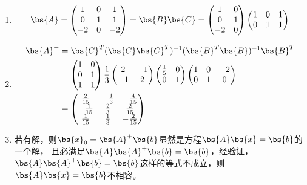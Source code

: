 \documentclass[12pt, a4paper, oneside, UTF8]{ctexbook}
\begin{document}
\subsection{}
\begin{enumerate}
\item 
\begin{align*}
\bs{A}=\begin{pmatrix}
    1& 0 &1 \\
    0& 1 & 1\\
    -2 & 0& -2
\end{pmatrix}=\bs{B}\bs{C}=\begin{pmatrix}
    1& 0  \\
    0& 1 \\
    -2 & 0
\end{pmatrix}\begin{pmatrix}
    1& 0  &1\\
    0& 1 &1\\
\end{pmatrix}
\end{align*}

\item  
\begin{align*}
    \bs{A}^+&=\bs{C}^T(\bs{C}\bs{C}^T)^{-1}(\bs{B}^T\bs{B})^{-1}\bs{B}^T \\
    &=\begin{pmatrix}
        1& 0  \\
        0& 1 \\
        1 & 1
    \end{pmatrix}
    \frac{1}{3}
    \begin{pmatrix}
        2& -1  \\
        -1& 2 \\
    \end{pmatrix}
    \begin{pmatrix}
        \frac{1}{5}& 0  \\
        0& 1 \\
    \end{pmatrix}
    \begin{pmatrix}
        1& 0 &-2 \\
        0& 1 & 0\\
    \end{pmatrix}\\
    &=\begin{pmatrix}
        \frac{2}{15}& -\frac{1}{3} &-\frac{4}{15} \\
        -\frac{1}{15}& \frac{2}{3} & \frac{2}{15}\\
        \frac{1}{15} & \frac{1}{3}& -\frac{2}{15}
    \end{pmatrix}
\end{align*}
\item  若有解，则$\bs{x}_0=\bs{A}^+\bs{b}$显然是方程$\bs{A}\bs{x}=\bs{b}$的一个解，
且必满足$\bs{A}\bs{A}^+\bs{b}=\bs{b}$，经验证，
$\bs{A}\bs{A}^+\bs{b}=\bs{b}$这样的等式不成立，则$\bs{A}\bs{x}=\bs{b}$不相容。


\end{enumerate}
\end{document}
